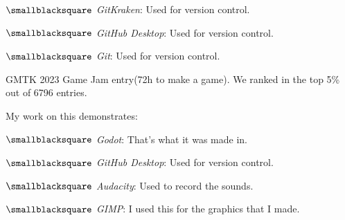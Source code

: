 \documentclass[10mm,letterpaper,notitlepage]{article}
\begin{document}
{{								$\smallblacksquare$ \textit{GitKraken}: Used for version control.
								
								$\smallblacksquare$ \textit{GitHub Desktop}: Used for version control.
								
								$\smallblacksquare$ \textit{Git}: Used for version control.
								
								\setlength{\parindent}{\parindent-4mm}
							\par}
							{\color[RGB]{0, 0, 0}
							\fontsize{2.25mm}{3.0mm}\selectfont
									{\color[RGB]{108, 29, 169}
									\fontsize{4.5mm}{6.0mm}\selectfont
									\color[RGB]{101, 82, 180}{{ }}
									\par}
							\nopagebreak
							GMTK 2023 Game Jam entry(72h to make a game). We ranked in the top 5\% out of 6796 entries.
							
							\nopagebreak
							My work on this demonstrates:
								\setlength{\parindent}{\parindent+4mm}
								
								\nopagebreak
								$\smallblacksquare$ \textit{Godot}: That's what it was made in.
								
								$\smallblacksquare$ \textit{GitHub Desktop}: Used for version control.
								
								$\smallblacksquare$ \textit{Audacity}: Used to record the sounds.
								
								$\smallblacksquare$ \textit{GIMP}: I used this for the graphics that I made.
								
}}
\end{document}
